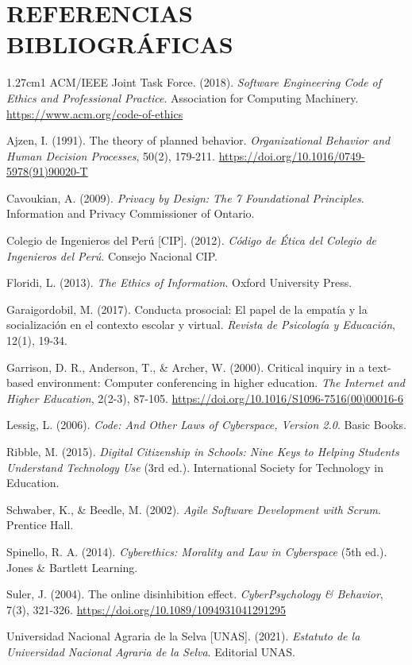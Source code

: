 \documentclass[12pt,a4paper]{article}
\begin{document}
\newpage

\section{REFERENCIAS BIBLIOGRÁFICAS}
\thispagestyle{empty}

\begin{hangparas}{1.27cm}{1}
ACM/IEEE Joint Task Force. (2018). \textit{Software Engineering Code of Ethics and Professional Practice}. Association for Computing Machinery. \url{https://www.acm.org/code-of-ethics}

Ajzen, I. (1991). The theory of planned behavior. \textit{Organizational Behavior and Human Decision Processes}, 50(2), 179-211. \url{https://doi.org/10.1016/0749-5978(91)90020-T}

Cavoukian, A. (2009). \textit{Privacy by Design: The 7 Foundational Principles}. Information and Privacy Commissioner of Ontario.

Colegio de Ingenieros del Perú [CIP]. (2012). \textit{Código de Ética del Colegio de Ingenieros del Perú}. Consejo Nacional CIP.

Floridi, L. (2013). \textit{The Ethics of Information}. Oxford University Press.

Garaigordobil, M. (2017). Conducta prosocial: El papel de la empatía y la socialización en el contexto escolar y virtual. \textit{Revista de Psicología y Educación}, 12(1), 19-34.

Garrison, D. R., Anderson, T., \& Archer, W. (2000). Critical inquiry in a text-based environment: Computer conferencing in higher education. \textit{The Internet and Higher Education}, 2(2-3), 87-105. \url{https://doi.org/10.1016/S1096-7516(00)00016-6}

Lessig, L. (2006). \textit{Code: And Other Laws of Cyberspace, Version 2.0}. Basic Books.

Ribble, M. (2015). \textit{Digital Citizenship in Schools: Nine Keys to Helping Students Understand Technology Use} (3rd ed.). International Society for Technology in Education.

Schwaber, K., \& Beedle, M. (2002). \textit{Agile Software Development with Scrum}. Prentice Hall.

Spinello, R. A. (2014). \textit{Cyberethics: Morality and Law in Cyberspace} (5th ed.). Jones \& Bartlett Learning.

Suler, J. (2004). The online disinhibition effect. \textit{CyberPsychology \& Behavior}, 7(3), 321-326. \url{https://doi.org/10.1089/1094931041291295}

Universidad Nacional Agraria de la Selva [UNAS]. (2021). \textit{Estatuto de la Universidad Nacional Agraria de la Selva}. Editorial UNAS.
\end{hangparas}
\end{document}
